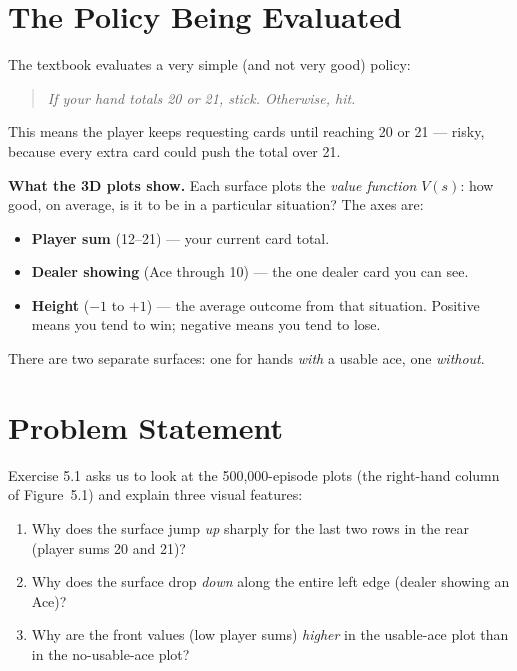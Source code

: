 \documentclass[11pt]{article}
\begin{document}
\section*{The Policy Being Evaluated}

The textbook evaluates a very simple (and not very good) policy:
\begin{quote}
    \textit{If your hand totals 20 or 21, stick. Otherwise, hit.}
\end{quote}
This means the player keeps requesting cards until reaching 20 or 21 --- risky, because every extra card could push the total over 21.

\textbf{What the 3D plots show.} Each surface plots the \textit{value function} $V(s)$: how good, on average, is it to be in a particular situation? The axes are:
\begin{itemize}[nosep]
    \item \textbf{Player sum} (12--21) --- your current card total.
    \item \textbf{Dealer showing} (Ace through 10) --- the one dealer card you can see.
    \item \textbf{Height} ($-1$ to $+1$) --- the average outcome from that situation. Positive means you tend to win; negative means you tend to lose.
\end{itemize}
There are two separate surfaces: one for hands \textit{with} a usable ace, one \textit{without}.

\section*{Problem Statement}

Exercise 5.1 asks us to look at the 500{,}000-episode plots (the right-hand column of Figure~5.1) and explain three visual features:

\begin{enumerate}
    \item Why does the surface jump \textit{up} sharply for the last two rows in the rear (player sums 20 and 21)?
    \item Why does the surface drop \textit{down} along the entire left edge (dealer showing an Ace)?
    \item Why are the front values (low player sums) \textit{higher} in the usable-ace plot than in the no-usable-ace plot?
\end{enumerate}
\end{document}

